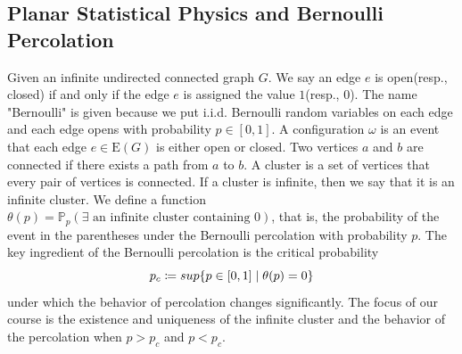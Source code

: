 \documentclass[12pt]{article}
\theoremstyle{plane}
\theoremstyle{definition}
\begin{document}
\subsection{Planar Statistical Physics and Bernoulli Percolation}
Given an infinite undirected connected graph $G$. We say an edge $e$ is open(resp., closed) if and only if the edge $e$ is assigned the value $1$(resp., $0$). The name "Bernoulli" is given because we put i.i.d. Bernoulli random variables on each edge and each edge opens with probability $p\in[0,1]$. A configuration $\omega$ is an event that each edge $e\in \text{E}(G)$ is either open or closed. Two vertices $a$ and $b$ are connected if there exists a path from $a$ to $b$. A cluster is a set of vertices that every pair of vertices is connected. If a cluster is infinite, then we say that it is an infinite cluster. We define a function $\theta(p)=\mathbb{P}_p(\exists\text{ an infinite cluster containing }0)$, that is, the probability of the event in the parentheses under the Bernoulli percolation with probability $p$. The key ingredient of the Bernoulli percolation is the critical probability \[p_c\coloneqq\\sup\{p\in [0,1]\mid \theta(p)=0\}\] under which the behavior of percolation changes significantly. The focus of our course is the existence and uniqueness of the infinite cluster and the behavior of the percolation when $p>p_c$ and $p<p_c$. 

\end{document}
